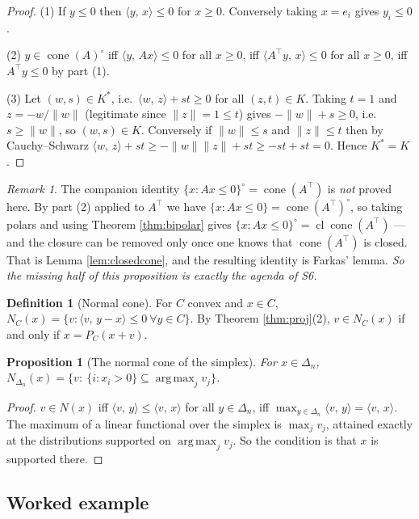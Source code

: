 \documentclass[11pt,a4paper]{article}
\theoremstyle{definition}
\newtheorem{definition}{Definition}
\theoremstyle{plain}
\newtheorem{proposition}[theorem]{Proposition}
\theoremstyle{remark}
\newtheorem*{remark}{Remark}
\newcommand{\ip}[2]{\langle #1,\, #2\rangle}
\newcommand{\norm}[1]{\lVert #1\rVert}
\newcommand{\proj}{P}
\DeclareMathOperator{\cone}{cone}
\DeclareMathOperator{\cl}{cl}
\DeclareMathOperator*{\argmax}{arg\,max}
\newcommand{\Simplex}{\Delta}
\newcommand{\Nc}{N}
\begin{document}
\begin{proof}
(1) If $y\le0$ then $\ip{y}{x}\le0$ for $x\ge0$. Conversely taking $x=e_i$ gives $y_i\le0$.

(2) $y\in\cone(A)^\circ$ iff $\ip{y}{Ax}\le0$ for all $x\ge0$, iff $\ip{A^\top y}{x}\le0$ for
all $x\ge0$, iff $A^\top y\le0$ by part (1).

(3) Let $(w,s)\in K^*$, i.e.\ $\ip{w}{z}+st\ge0$ for all $(z,t)\in K$. Taking $t=1$ and
$z=-w/\norm w$ (legitimate since $\norm z=1\le t$) gives $-\norm w+s\ge0$, i.e.\ $s\ge\norm w$,
so $(w,s)\in K$. Conversely if $\norm w\le s$ and $\norm z\le t$ then by Cauchy--Schwarz
$\ip{w}{z}+st\ge-\norm w\norm z+st\ge-st+st=0$. Hence $K^*=K$.
\end{proof}

\begin{remark}
The companion identity $\{x:Ax\le0\}^\circ=\cone(A^\top)$ is \emph{not} proved here. By part (2)
applied to $A^\top$ we have $\{x:Ax\le0\}=\cone(A^\top)^\circ$, so taking polars and using
Theorem \ref{thm:bipolar} gives $\{x:Ax\le0\}^\circ=\cl\cone(A^\top)$ --- and the closure can be
removed only once one knows that $\cone(A^\top)$ is closed. That is Lemma \ref{lem:closedcone},
and the resulting identity is Farkas' lemma. \emph{So the missing half of this proposition is
exactly the agenda of S6.}
\end{remark}

\begin{definition}[Normal cone]
\label{def:normal}
For $C$ convex and $x\in C$, $\Nc_C(x)=\{v:\ip{v}{y-x}\le0\ \forall y\in C\}$. By Theorem
\ref{thm:proj}(2), $v\in\Nc_C(x)$ if and only if $x=\proj_C(x+v)$.
\end{definition}

\begin{proposition}[The normal cone of the simplex]
\label{prop:normalsimplex}
For $x\in\Simplex_n$, $\Nc_{\Simplex_n}(x)=\{v:\ \{i:x_i>0\}\subseteq\argmax_jv_j\}$.
\end{proposition}

\begin{proof}
$v\in\Nc(x)$ iff $\ip{v}{y}\le\ip{v}{x}$ for all $y\in\Simplex_n$, iff
$\max_{y\in\Simplex_n}\ip{v}{y}=\ip{v}{x}$. The maximum of a linear functional over the simplex
is $\max_jv_j$, attained exactly at the distributions supported on $\argmax_jv_j$. So the
condition is that $x$ is supported there.
\end{proof}

\subsection*{Worked example}
\end{document}
